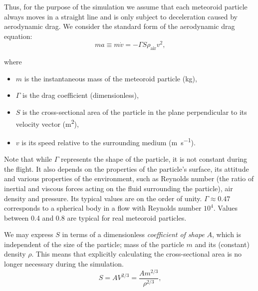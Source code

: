             Thus, for the purpose of the simulation we assume that each meteoroid particle always moves in a straight line
            and is only subject to deceleration caused by aerodynamic drag. We consider the standard form of the
            aerodynamic drag equation:
            \begin{equation}
                ma \equiv m\dot{v} = -\Gamma S \rho_{\mathrm{air}} v^2\text{,}
                \label{sim:pmf:em:be:ma}
            \end{equation}

            where
            \begin{itemize}
                \item $m$ is the instantaneous mass of the meteoroid particle (\si{\kilo\gram}),
                \item $\Gamma$ is the drag coefficient (dimensionless),
                \item $S$ is the cross-sectional area of the particle in the plane perpendicular to its velocity vector (\si{\metre\squared}),
                \item $v$ is its speed relative to the surrounding medium (\si{\metre\per\second}).
            \end{itemize}

            Note that while $\Gamma$ represents the shape of the particle, it is not constant during the flight.
            It also depends on the properties of the particle's surface, its attitude and various properties of the environment,
            such as Reynolds number (the ratio of inertial and viscous forces acting on the fluid surrounding the particle),
            air density and pressure. Its typical values are on the order of unity.
            $\Gamma \approx \num{0.47}$ corresponds to a spherical body in a flow with Reynolds number $10^4$.
            Values between \num{0.4} and \num{0.8} are typical for real meteoroid particles.

            We may express $S$ in terms of a dimensionless \emph{coefficient of shape} $A$, which is independent of the size of the particle;
            mass of the particle $m$ and its (constant) density $\rho$. This means that explicitly calculating the cross-sectional
            area is no longer necessary during the simulation.
            \begin{equation}
                S = A V^{2/3} = \frac{A m^{2/3}}{\rho^{2/3}}\text{,}
                \label{sim:pmf:be:S}
            \end{equation}

